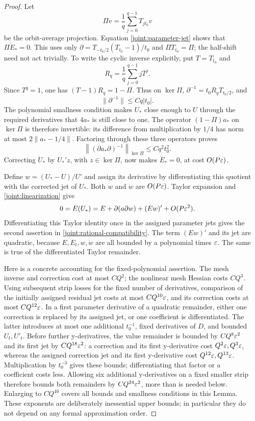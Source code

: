 \begin{proof}
Let
\[
 \Pi v=\frac1q\sum_{j=0}^{q-1}T_{jt_0}v
\]
be the orbit-average projection. Equation \eqref{joint:parameter-jet}
shows that \(\Pi\dot E_*=0\). This uses only
\(\partial=T_{-t_0/2}(T_{t_0}-1)/t_0\) and \(\Pi T_{t_0}=\Pi\);
the half-shift need not act trivially. To write the cyclic inverse
explicitly, put \(T=T_{t_0}\) and
\[
 R_q=\frac1q\sum_{j=0}^{q-1}jT^j.
\]
Since \(T^q=1\), one has \((T-1)R_q=1-\Pi\). Thus on \(\ker\Pi\),
\(\partial^{-1}=t_0R_qT_{t_0/2}\), and
\[
 \|\partial^{-1}\|\le Cq|t_0|.
\]
The polynomial smallness condition makes \(U_*\) close enough to \(U\)
through the required derivatives that \(4a_*\) is still close to one.
The operator \((1-\Pi)a_*\) on \(\ker\Pi\) is therefore invertible: its
difference from multiplication by \(1/4\) has norm at most
\(2\|a_*-1/4\|\). Factoring through these
three operators proves
\begin{equation}
 \left\|(\partial a_*\partial)^{-1}\right\|_{\ker\Pi}
       \le Cq^2t_0^2.
 \label{joint:rational-jet-inverse}
\end{equation}
Correcting \(\dot U_*\) by \(U_*'z\), with \(z\in\ker\Pi\), now makes
\(\dot E_*=0\), at cost \(O(P\varepsilon)\).

Define \(w=(U_*-U)/U'\) and assign its derivative by differentiating
this quotient with the corrected jet of \(U_*\). Both \(w\) and
\(\dot w\) are \(O(P\varepsilon)\). Taylor expansion and
\eqref{joint:linearization} give
\[
 0=E(U_*)=E+\partial(a\partial w)+(Ew)'+O(P\varepsilon^2).
\]
Differentiating this Taylor identity once in the assigned parameter jets
gives the second assertion in \eqref{joint:rational-compatibility}.
The term \((Ew)'\) and its jet are quadratic, because \(E,E_t,w,\dot w\)
are all bounded by a polynomial times \(\varepsilon\). The same is true of
the differentiated Taylor remainder.

Here is a concrete accounting for the fixed-polynomial assertion. The
mesh inverse and correction cost at most \(CQ^2\); the nonlinear mesh
Hessian costs \(CQ^3\). Using subsequent strip losses for the fixed
number of derivatives, comparison of the initially assigned residual
jet costs at most \(CQ^{10}\varepsilon\), and its correction costs at most
\(CQ^{12}\varepsilon\). In a first parameter derivative of a quadratic
remainder, either one correction is replaced by its assigned jet, or
one coefficient is differentiated. The latter introduces at most one
additional \(t_0^{-1}\), fixed derivatives of \(D\), and bounded
\(U_t,U'_t\). Before further y-derivatives, the value remainder is
bounded by \(CQ^8\varepsilon^2\) and its first jet by \(CQ^{18}\varepsilon^2\): a
correction and its first y-derivative cost \(Q^2\varepsilon,Q^3\varepsilon\), whereas
the assigned correction jet and its first y-derivative cost
\(Q^{12}\varepsilon,Q^{13}\varepsilon\). Multiplication by \(t_0^{-3}\) gives these
bounds; differentiating that factor or a coefficient costs less.
Allowing six additional y-derivatives on a fixed smaller strip therefore
bounds both remainders by \(CQ^{24}\varepsilon^2\), more than is needed below.
Enlarging
to \(CQ^{40}\) covers all bounds and smallness conditions in this
Lemma. These exponents are deliberately inessential upper bounds; in
particular they do not depend on any formal approximation order.


\end{proof}
